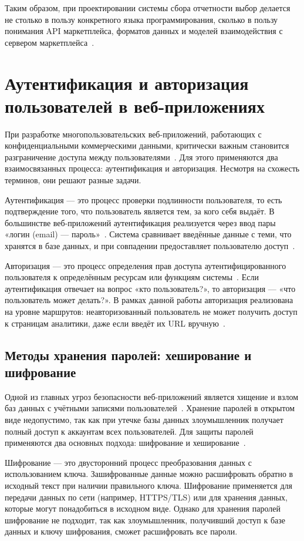 Таким образом, при проектировании системы сбора отчетности выбор делается не столько в пользу конкретного языка программирования, сколько в пользу понимания API маркетплейса, форматов данных и моделей взаимодействия с сервером маркетплейса~\cite{retailcrmOzon}.

\section{Аутентификация и авторизация пользователей в веб-приложениях}

При разработке многопользовательских веб-приложений, работающих с конфиденциальными коммерческими данными, критически важным становится разграничение доступа между пользователями~\cite{authBasics}. Для этого применяются два взаимосвязанных процесса: аутентификация и авторизация. Несмотря на схожесть терминов, они решают разные задачи.

Аутентификация — это процесс проверки подлинности пользователя, то есть подтверждение того, что пользователь является тем, за кого себя выдаёт. В большинстве веб-приложений аутентификация реализуется через ввод пары «логин (email) — пароль»~\cite{authBasics}. Система сравнивает введённые данные с теми, что хранятся в базе данных, и при совпадении предоставляет пользователю доступ~\cite{bookWebAuth}.

Авторизация — это процесс определения прав доступа аутентифицированного пользователя к определённым ресурсам или функциям системы~\cite{authBasics}. Если аутентификация отвечает на вопрос «кто пользователь?», то авторизация — «что пользователь может делать?». В рамках данной работы авторизация реализована на уровне маршрутов: неавторизованный пользователь не может получить доступ к страницам аналитики, даже если введёт их URL вручную~\cite{bookNextjs}.

\subsection{Методы хранения паролей: хеширование и шифрование}

Одной из главных угроз безопасности веб-приложений является хищение и взлом баз данных с учётными записями пользователей~\cite{owaspPasswords}. Хранение паролей в открытом виде недопустимо, так как при утечке базы данных злоумышленник получает полный доступ к аккаунтам всех пользователей. Для защиты паролей применяются два основных подхода: шифрование и хеширование~\cite{bookCryptography}.

Шифрование — это двусторонний процесс преобразования данных с использованием ключа. Зашифрованные данные можно расшифровать обратно в исходный текст при наличии правильного ключа. Шифрование применяется для передачи данных по сети (например, HTTPS/TLS) или для хранения данных, которые могут понадобиться в исходном виде. Однако для хранения паролей шифрование не подходит, так как злоумышленник, получивший доступ к базе данных и ключу шифрования, сможет расшифровать все пароли.

